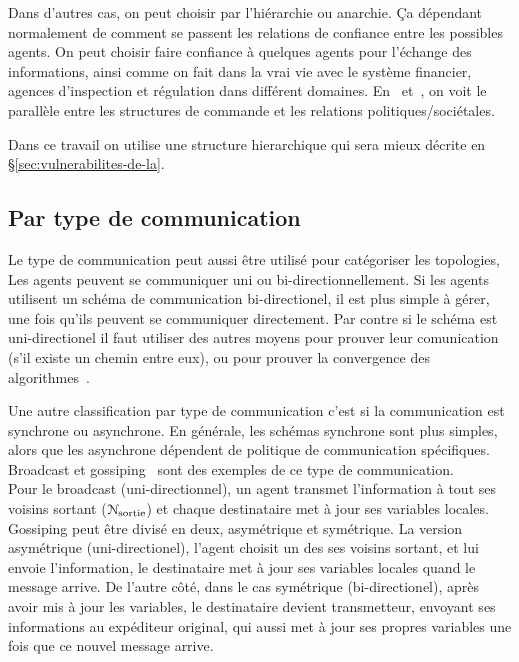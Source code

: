 \documentclass[../main.tex]{subfiles}
\begin{document}
Dans d'autres cas, on peut choisir par l'hiérarchie ou anarchie.
Ça dépendant normalement de comment se passent les relations de confiance entre les possibles agents.
On peut choisir faire confiance à quelques agents pour l'échange des informations, ainsi comme on fait dans la vrai vie avec le système financier, agences d'inspection et régulation dans différent domaines.
En~\cite{McNamaraEtAl2018} et~\cite{OlaruEtAl2018}, on voit le parallèle entre les structures de commande et les relations politiques/sociétales.

Dans ce travail on utilise une structure hierarchique qui sera mieux décrite en
\S\ref{sec:vulnerabilites-de-la}.

\subsection{Par type de communication}\label{sec:par-type-de}

Le type de communication peut aussi être utilisé pour catégoriser les topologies,
Les agents peuvent se communiquer uni ou bi-directionnellement.
Si les agents utilisent un schéma de communication bi-directionel, il est plus simple à gérer, une fois qu'ils peuvent se communiquer directement.
Par contre si le schéma est uni-directionel il faut utiliser des autres moyens pour prouver leur comunication (s'il existe un chemin entre eux), ou pour prouver la convergence des algorithmes~\cite{GarinSchenato2010}.

Une autre classification par type de communication c'est si la communication est synchrone ou asynchrone.
En générale, les schémas synchrone sont plus simples, alors que les asynchrone dépendent de politique de communication spécifiques.
Broadcast et gossiping~\cite{GarinSchenato2010} sont des exemples de ce type de communication.
\\Pour le broadcast (uni-directionnel), un agent transmet l'information à tout ses voisins sortant ($\mathcal{N}_{\text{sortie}}$) et chaque destinataire met à jour ses variables locales.
\\Gossiping peut être divisé en deux, asymétrique et symétrique.
La version asymétrique (uni-directionel), l'agent choisit un des ses voisins sortant, et lui envoie l'information, le destinataire met à jour ses variables locales quand le message arrive.
De l'autre côté, dans le cas symétrique (bi-directionel), après avoir mis à jour les variables, le destinataire devient transmetteur, envoyant ses informations au expéditeur original, qui aussi met à jour ses propres variables une fois que ce nouvel message arrive.
\end{document}
